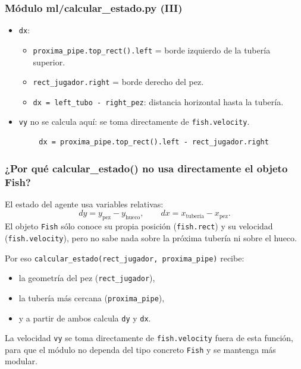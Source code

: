 \documentclass[
	11pt, %
]{beamer}
\begin{document}

\begin{frame}[fragile]
\frametitle{Módulo ml/calcular\_estado.py (III)}

\begin{itemize}
    \item \texttt{dx}:
    \begin{itemize}
        \item \texttt{proxima\_pipe.top\_rect().left} = borde izquierdo de la tubería superior.
        \item \texttt{rect\_jugador.right} = borde derecho del pez.
        \item \texttt{dx = left\_tubo - right\_pez}: distancia horizontal hasta la tubería.
    \end{itemize}
    \item \texttt{vy} no se calcula aquí: se toma directamente de \texttt{fish.velocity}.
\end{itemize}

{\scriptsize
\begin{verbatim}
        dx = proxima_pipe.top_rect().left - rect_jugador.right
\end{verbatim}
}

\end{frame}


\begin{frame}
\frametitle{¿Por qué calcular\_estado() no usa directamente el objeto Fish?}

El estado del agente usa variables relativas:
    \[
        dy = y_{\text{pez}} - y_{\text{hueco}}, \qquad
        dx = x_{\text{tubería}} - x_{\text{pez}}.
    \]
El objeto \texttt{Fish} sólo conoce su propia posición
          (\texttt{fish.rect}) y su velocidad (\texttt{fish.velocity}),
          pero no sabe nada sobre la próxima tubería ni sobre el hueco.

Por eso \texttt{calcular\_estado(rect\_jugador, proxima\_pipe)} recibe:
    \begin{itemize}
        \item la geometría del pez (\texttt{rect\_jugador}),
        \item la tubería más cercana (\texttt{proxima\_pipe}),
        \item y a partir de ambos calcula \texttt{dy} y \texttt{dx}.
    \end{itemize}

La velocidad \texttt{vy} se toma directamente de \texttt{fish.velocity}
fuera de esta función, para que el módulo no dependa del tipo concreto \texttt{Fish} y se mantenga más modular.

\end{frame}
\end{document}
